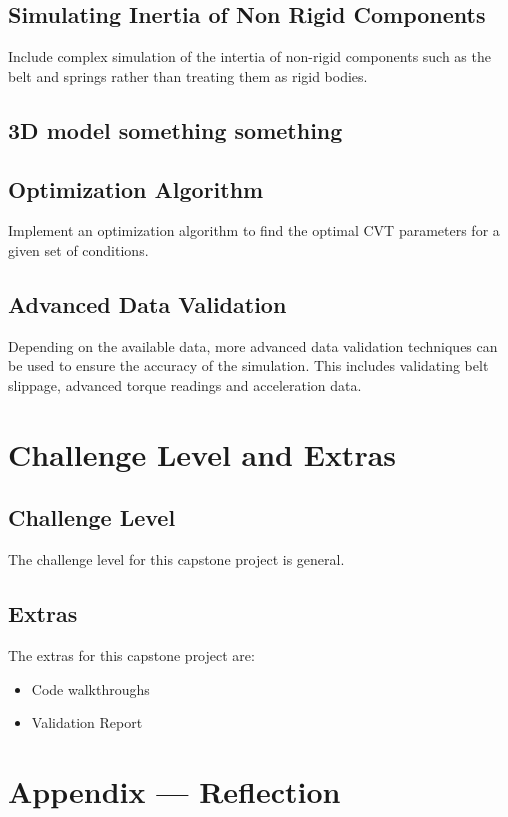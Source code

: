 \documentclass{article}
\begin{document}
\subsection{Simulating Inertia of Non Rigid Components}
Include complex simulation of the intertia of non-rigid components such as the belt and 
springs rather than treating them as rigid bodies.

\subsection{3D model something something}

\subsection{Optimization Algorithm}
Implement an optimization algorithm to find the optimal CVT parameters for a given set of 
conditions.

\subsection{Advanced Data Validation}
Depending on the available data, more advanced data validation techniques can be used to 
ensure the accuracy of the simulation. This includes validating belt slippage, advanced torque readings and 
acceleration data.

\section{Challenge Level and Extras}

\subsection{Challenge Level}

The challenge level for this capstone project is general.

\subsection{Extras}
The extras for this capstone project are:
\begin{itemize}
    \item Code walkthroughs
    \item Validation Report
\end{itemize}


\newpage{}

\section*{Appendix --- Reflection}
\end{document}
